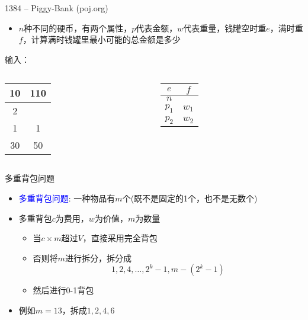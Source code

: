 \begin{frame}{1384 -- Piggy-Bank (poj.org)}
    \begin{itemize}
        \item $n$种不同的硬币，有两个属性，$p$代表金额，$w$代表重量，钱罐空时重$e$，满时重$f$，计算满时钱罐里最小可能的总金额是多少
    \end{itemize}
    \vfill
    \begin{exampleblock}{输入：}
        \begin{columns}
            \begin{table}
                \begin{tabular}{cc}
                10 & 110 \\\hline
                2 &  \\\hline
                1 & 1 \\\hline
                \alert{30} & \alert{50} \\\hline
                \end{tabular}
            \end{table}
            \begin{table}
                \begin{tabular}{cc}
                $e$ & $f$ \\\hline
                $n$ \\\hline
                $p_1$ & $w_1$ \\\hline
                $p_2$ & $w_2$ \\\hline
                \end{tabular}
            \end{table}
        \end{columns}
    \end{exampleblock}
\end{frame}  
\begin{frame}{多重背包问题}
    \begin{itemize}
        \item \textcolor{blue}{多重背包问题}: 一种物品有$m$个(既不是固定的1个，也不是无数个)
        \vfill
        \item 多重背包$c$为费用，$w$为价值，$m$为数量
        \begin{itemize}                
            \item 当$c\times m$超过$V$，直接采用完全背包
            \item 否则将$m$进行拆分，拆分成$$1,2,4,…,2^k-1,𝑚−(2^k-1)$$
            \item 然后进行0-1背包
        \end{itemize}
        \vfill
        \item 例如$m=13$，拆成$1,2,4,6$
    \end{itemize}
\end{frame}       
